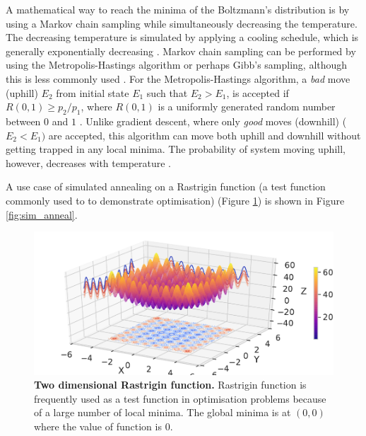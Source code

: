 A mathematical way to reach the minima of the Boltzmann's distribution is by using a Markov chain sampling while simultaneously decreasing the temperature. The decreasing temperature is simulated by applying a cooling schedule, which is generally exponentially decreasing \cite{Kirkpatrick1983-hh}. Markov chain sampling can be performed by using the Metropolis-Hastings algorithm or perhaps Gibb's sampling, although this is less commonly used  \cite{Keith2002-jx}. For the Metropolis-Hastings algorithm, a \textit{bad} move (uphill) $E_2$ from initial state $E_1$ such that $E_2 > E_1$, is accepted if $R(0,1) \geq p_2/p_1$, where $R(0,1)$ is a uniformly generated random number between $0$ and $1$ \cite{hastings1970monte}. Unlike gradient descent, where only \textit{good} moves (downhill) ($E_2 < E_1)$ are accepted, this algorithm can move both uphill and downhill without getting trapped in any local minima. The probability of system moving uphill, however, decreases with temperature \cite{presse1988numerical}. 


A use case of simulated annealing on a Rastrigin function (a test function commonly used to to demonstrate optimisation) (Figure \ref{fig:rastrigin}) is shown in Figure \ref{fig:sim_anneal}. 

\begin{figure}[H]
\center
\includegraphics[width=1\textwidth]{chapters/Introduction/Figures/rastrigin.pdf}
\caption[Two dimensional Rastrigin function.]{\textbf{Two dimensional Rastrigin function.} Rastrigin function is frequently used as a test function in optimisation problems because of a large number of local minima. The global minima is at $(0, 0)$ where the value of function is $0$.}%
\label{fig:rastrigin}
\end{figure}


